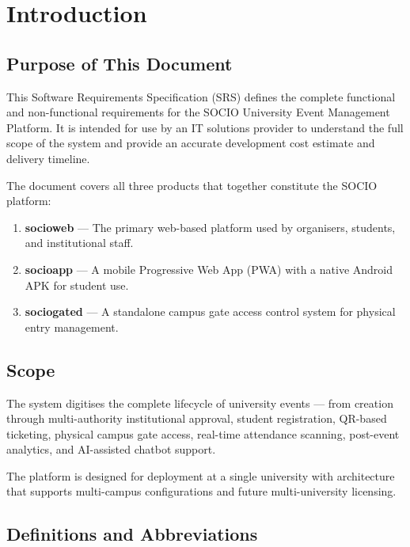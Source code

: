 \documentclass[12pt,a4paper]{article}
\begin{document}
\newpage
\tableofcontents
\newpage

\section{Introduction}

\subsection{Purpose of This Document}

This Software Requirements Specification (SRS) defines the complete functional and non-functional requirements for the SOCIO University Event Management Platform. It is intended for use by an IT solutions provider to understand the full scope of the system and provide an accurate development cost estimate and delivery timeline.

The document covers all three products that together constitute the SOCIO platform:

\begin{enumerate}[leftmargin=*]
    \item \textbf{socioweb} — The primary web-based platform used by organisers, students, and institutional staff.
    \item \textbf{socioapp} — A mobile Progressive Web App (PWA) with a native Android APK for student use.
    \item \textbf{sociogated} — A standalone campus gate access control system for physical entry management.
\end{enumerate}

\subsection{Scope}

The system digitises the complete lifecycle of university events — from creation through multi-authority institutional approval, student registration, QR-based ticketing, physical campus gate access, real-time attendance scanning, post-event analytics, and AI-assisted chatbot support.

The platform is designed for deployment at a single university with architecture that supports multi-campus configurations and future multi-university licensing.

\subsection{Definitions and Abbreviations}
\end{document}
